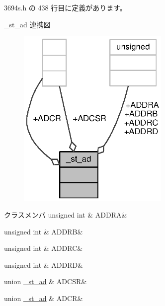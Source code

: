  3694s.\+h の 438 行目に定義があります。



\+\_\+st\+\_\+ad 連携図
\nopagebreak
\begin{figure}[H]
\begin{center}
\leavevmode
\includegraphics[width=207pt]{d5/d8b/struct__st__ad__coll__graph}
\end{center}
\end{figure}
\begin{DoxyFields}{クラスメンバ}
unsigned int\label{3694s_8h_acc59fd281b2f120f6ba1404c0dcec893}
&
A\+D\+D\+R\+A&
\\
\hline

unsigned int\label{3694s_8h_a14787420e1de6c66a59c2f06f4f7c10c}
&
A\+D\+D\+R\+B&
\\
\hline

unsigned int\label{3694s_8h_ac3e350a25e5e82521c00bd5ea7644a83}
&
A\+D\+D\+R\+C&
\\
\hline

unsigned int\label{3694s_8h_a920e24477afc276a9a0625228d4d2e65}
&
A\+D\+D\+R\+D&
\\
\hline

union \hyperlink{3694s_8h_d1/db6/union__st__ad_8ADCSR}{\+\_\+st\+\_\+ad}\label{3694s_8h_ab8813ec721808f046f30ce491c4852d4}
&
A\+D\+C\+S\+R&
\\
\hline

union \hyperlink{3694s_8h_d5/d88/union__st__ad_8ADCR}{\+\_\+st\+\_\+ad}\label{3694s_8h_a49656f09203f07c08a150ad6c0df1067}
&
A\+D\+C\+R&
\\
\hline

\end{DoxyFields}
\label{struct__st__wdt}
